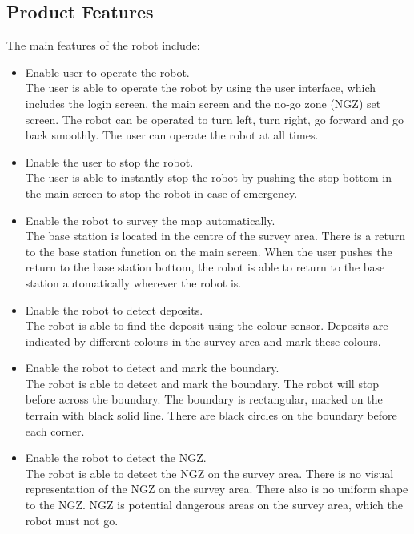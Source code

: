\documentclass[11pt, a4paper]{article}
\begin{document}
\subsection{Product Features}
The main features of the robot include: \\
\begin{itemize}
\item Enable user to operate the robot.\\
The user is able to operate the robot by using the user interface, which includes the login screen, the main screen and the no-go zone (NGZ) set screen. The robot can be operated to turn left, turn right, go forward and go back smoothly. The user can operate the robot at all times. \\

\item Enable the user to stop the robot.\\
The user is able to instantly stop the robot by pushing the stop bottom in the main screen to stop the robot in case of emergency.\\

\item Enable the robot to survey the map automatically.\\
The base station is located in the centre of the survey area. There is a return to the base station function on the main screen. When the user pushes the return to the base station bottom, the robot is able to return to the base station automatically wherever the robot is.\\

\item Enable the robot to detect deposits.\\
The robot is able to find the deposit using the colour sensor. Deposits are indicated by different colours in the survey area and mark these colours.\\

\item Enable the robot to detect and mark the boundary.\\
The robot is able to detect and mark the boundary. The robot will stop before across the boundary. The boundary is rectangular, marked on the terrain with black solid line. There are black circles on the boundary before each corner.\\

\item Enable the robot to detect the NGZ.\\
The robot is able to detect the NGZ on the survey area. There is no visual representation of the NGZ on the survey area. There also is no uniform shape to the NGZ. NGZ is potential dangerous areas on the survey area, which the robot must not go.\\


\end{itemize}
\end{document}
